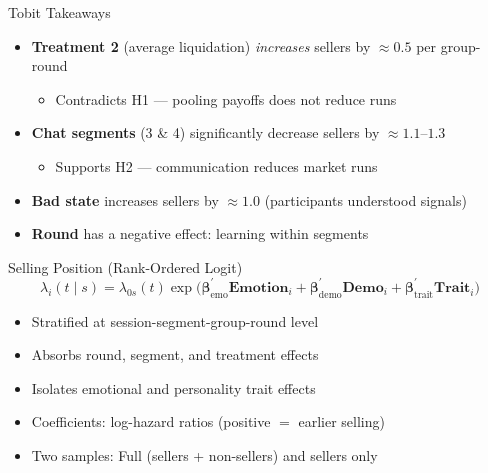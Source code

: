 \documentclass{beamer}
\begin{document}
\begin{frame}{Tobit Takeaways}
\begin{itemize}
    \item \textbf{Treatment 2} (average liquidation) \textit{increases} sellers by $\approx 0.5$ per group-round
    \begin{itemize}
        \item Contradicts H1 --- pooling payoffs does not reduce runs
    \end{itemize}
    \item \textbf{Chat segments} (3 \& 4) significantly decrease sellers by $\approx 1.1$--$1.3$
    \begin{itemize}
        \item Supports H2 --- communication reduces market runs
    \end{itemize}
    \item \textbf{Bad state} increases sellers by $\approx 1.0$ (participants understood signals)
    \item \textbf{Round} has a negative effect: learning within segments
\end{itemize}
\end{frame}


\begin{frame}{Selling Position (Rank-Ordered Logit)}
\vspace{-0.2cm}
\begin{equation*}
    \lambda_i(t \mid s) = \lambda_{0s}(t) \exp\bigl(
    \boldsymbol{\beta}_{\text{emo}}^{\prime} \mathbf{Emotion}_i + \boldsymbol{\beta}_{\text{demo}}^{\prime} \mathbf{Demo}_i
     + \boldsymbol{\beta}_{\text{trait}}^{\prime} \mathbf{Trait}_i \bigr)
\end{equation*}

\begin{itemize}
    \item Stratified at session-segment-group-round level
    \item Absorbs round, segment, and treatment effects
    \item Isolates emotional and personality trait effects
    \item Coefficients: log-hazard ratios (positive $=$ earlier selling)
    \item Two samples: Full (sellers + non-sellers) and sellers only
\end{itemize}
\end{frame}
\end{document}
